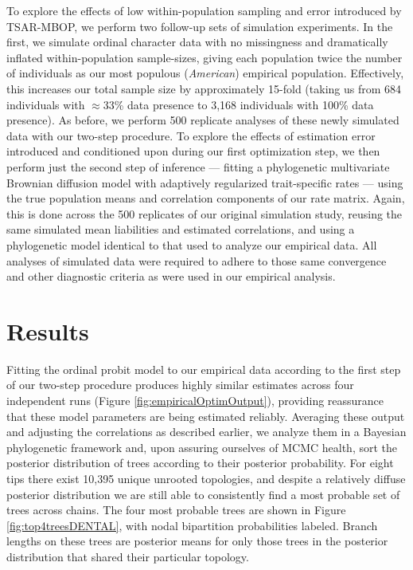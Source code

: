 \documentclass[10pt, twocolumn, twoside]{article}
\begin{document}
To explore the effects of low within-population sampling and error introduced by TSAR-MBOP, we perform two follow-up sets of simulation experiments. In the first, we simulate ordinal character data with no missingness and dramatically inflated within-population sample-sizes, giving each population twice the number of individuals as our most populous (\textit{American}) empirical population. Effectively, this increases our total sample size by approximately 15-fold (taking us from 684 individuals with $\approx$33\% data presence to 3,168 individuals with 100\% data presence). As before, we perform 500 replicate analyses of these newly simulated data with our two-step procedure. To explore the effects of estimation error introduced and conditioned upon during our first optimization step, we then perform just the second step of inference --- fitting a phylogenetic multivariate Brownian diffusion model with adaptively regularized trait-specific rates --- using the true population means and correlation components of our rate matrix. Again, this is done across the 500 replicates of our original simulation study, reusing the same simulated mean liabilities and estimated correlations, and using a phylogenetic model identical to that used to analyze our empirical data. All analyses of simulated data were required to adhere to those same convergence and other diagnostic criteria as were used in our empirical analysis.

\clearpage

\section{Results}

Fitting the ordinal probit model to our empirical data according to the first step of our two-step procedure produces highly similar estimates across four independent runs (Figure \ref{fig:empiricalOptimOutput}), providing reassurance that these model parameters are being estimated reliably. Averaging these output and adjusting the correlations as described earlier, we analyze them in a Bayesian phylogenetic framework and, upon assuring ourselves of MCMC health, sort the posterior distribution of trees according to their posterior probability. For eight tips there exist 10,395 unique unrooted topologies, and despite a relatively diffuse posterior distribution we are still able to consistently find a most probable set of trees across chains. The four most probable trees are shown in Figure \ref{fig:top4treesDENTAL}, with nodal bipartition probabilities labeled. Branch lengths on these trees are posterior means for only those trees in the posterior distribution that shared their particular topology. 
\end{document}
